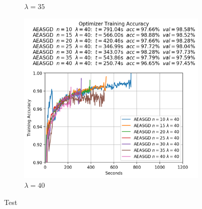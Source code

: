 \begin{figure}
\begin{subfigure}{.3\textwidth}
    \caption{$\lambda = 35$}
  \end{subfigure}
  \begin{subfigure}{.3\textwidth}
    \centering
    \includegraphics[width=\linewidth]{resources/images/aeasgd_experiments_lambda_40}
    \caption{$\lambda = 40$}
  \end{subfigure}
  \caption{Test}
  \label{fig:aeasgd_experiments_lambdas}
\end{figure}
